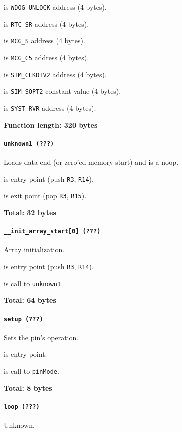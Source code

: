  is \texttt{WDOG\_UNLOCK} address (4 bytes).

 is \texttt{RTC\_SR} address (4 bytes).

 is \texttt{MCG\_S} address (4 bytes).

 is \texttt{MCG\_C5} address (4 bytes).

 is \texttt{SIM\_CLKDIV2} address (4 bytes).

 is \texttt{SIM\_SOPT2} constant value (4 bytes).

 is \texttt{SYST\_RVR} address (4 bytes).

\textbf{Function length: 320 bytes}

\paragraph{\texttt{unknown1 (???)}} Loads data end (or zero'ed memory start) and
is a noop.

 is entry point (push \texttt{R3}, \texttt{R14}).

 is exit point (pop \texttt{R3}, \texttt{R15}).

\textbf{Total: 32 bytes}

\paragraph{\texttt{\_\_init\_array\_start[0] (???)}} Array initialization.

 is entry point (push \texttt{R3}, \texttt{R14}).

 is call to \texttt{unknown1}.

\textbf{Total: 64 bytes}

\paragraph{\texttt{setup (???)}} Sets the pin's operation.

 is entry point.

 is call to \texttt{pinMode}.

\textbf{Total: 8 bytes}

\paragraph{\texttt{loop (???)}} Unknown.

